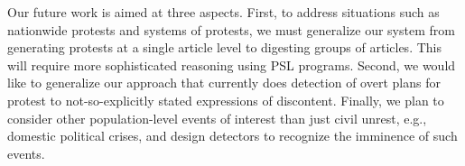 \documentclass[letterpaper]{article}
\begin{document}
Our future work is aimed at three aspects. First, to address situations such as nationwide protests and systems of protests,
we must generalize our system from generating protests at a single article level to digesting groups of articles. This will
require more sophisticated reasoning using PSL programs. 
Second, we would like to generalize our approach that currently
does detection of overt plans for protest to not-so-explicitly stated expressions of discontent. 
Finally, we plan to consider other population-level events of interest than just civil unrest, e.g., domestic political crises,
and design detectors to recognize the imminence of such events.

\small


\end{document}
